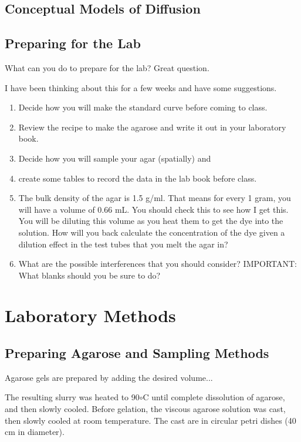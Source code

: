 \documentclass{tufte-handout}
\begin{document}
\subsection{Conceptual Models of Diffusion}


\subsection{Preparing for the Lab}

What can you do to prepare for the lab?  Great question. 

I have been thinking about this for a few weeks and have some suggestions.

\begin{enumerate}
	\item Decide how you will make the standard curve before coming to class.
	\item Review the recipe to make the agarose and write it out in your laboratory book.
	\item Decide how you will sample your agar (spatially) and 
	\item create some tables to record the data in the lab book before class.

	\item The bulk density of the agar is 1.5 g/ml. That means for every 1 gram, you will have a volume of 0.66 mL.  You should check this to see how I get this.  You will be diluting this volume as you heat them to get the dye into the solution. How will you back calculate the concentration of the dye given a dilution effect in the test tubes that  you melt the agar in?

	\item What are the possible interferences that you should consider?  IMPORTANT: What blanks should you be sure to do?
\end{enumerate}


\section{Laboratory Methods}

\subsection{Preparing Agarose and Sampling Methods}

Agarose gels are prepared by adding the desired volume... 

The resulting slurry was heated to 90$\circ$C until complete dissolution of agarose, and then slowly cooled. Before gelation, the viscous agarose solution was cast, then slowly cooled at room temperature. The cast are in circular petri dishes (40 cm in diameter).
\end{document}
